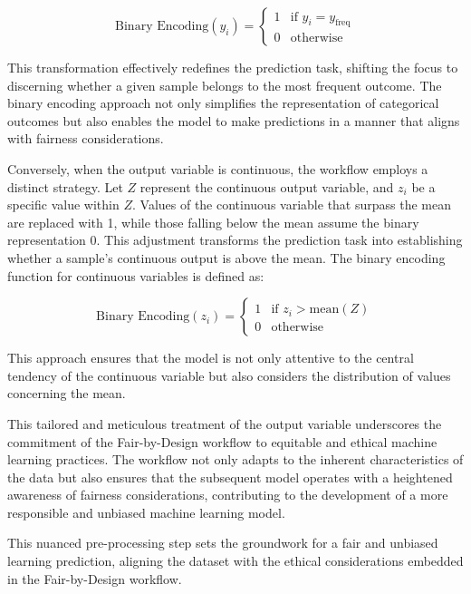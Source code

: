 \documentclass[12pt,a4paper,openright,twoside]{book}
\begin{document}
\begin{enumerate}
    \[
    \text{Binary Encoding}(y_i) = \begin{cases} 
    1 & \text{if } y_i = y_{\text{freq}} \\ 
    0 & \text{otherwise}
    \end{cases}
    \]

    This transformation effectively redefines the prediction task, shifting the focus to discerning whether a given sample belongs to the most frequent outcome. The binary encoding approach not only simplifies the representation of categorical outcomes but also enables the model to make predictions in a manner that aligns with fairness considerations.


    Conversely, when the output variable is continuous, the workflow employs a distinct strategy. Let $Z$ represent the continuous output variable, and $z_i$ be a specific value within $Z$. Values of the continuous variable that surpass the mean are replaced with 1, while those falling below the mean assume the binary representation 0. This adjustment transforms the prediction task into establishing whether a sample's continuous output is above the mean. The binary encoding function for continuous variables is defined as:

    \[
    \text{Binary Encoding}(z_i) = \begin{cases} 
    1 & \text{if } z_i > \text{mean}(Z) \\ 
    0 & \text{otherwise}
    \end{cases}
    \]

    This approach ensures that the model is not only attentive to the central tendency of the continuous variable but also considers the distribution of values concerning the mean.

    This tailored and meticulous treatment of the output variable underscores the commitment of the Fair-by-Design workflow to equitable and ethical machine learning practices. The workflow not only adapts to the inherent characteristics of the data but also ensures that the subsequent model operates with a heightened awareness of fairness considerations, contributing to the development of a more responsible and unbiased machine learning model.

\end{enumerate}

This nuanced pre-processing step sets the groundwork for a fair and unbiased learning prediction, aligning the dataset with the ethical considerations embedded in the Fair-by-Design workflow.
\end{document}
